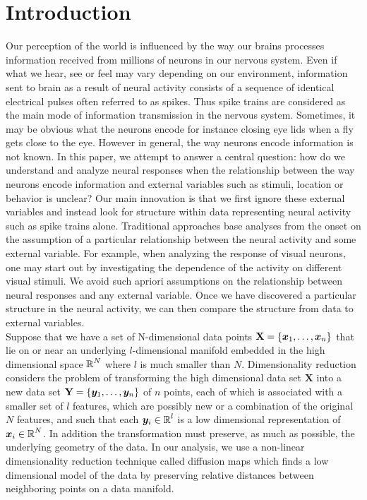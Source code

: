 
\section{Introduction}
 Our perception of the world is influenced by the way our brains processes information received from millions of neurons
 in our nervous system. Even if what we hear, see or feel may vary depending on our environment, information sent to brain
 as a result of neural activity consists of a sequence of identical electrical pulses often referred to as spikes.
 Thus spike trains are considered as the main mode of information transmission in the nervous system.  Sometimes, it may be obvious what the neurons encode for instance closing eye lids when a fly gets close to the eye. However in general,  the way neurons encode information is not known. In this paper, we attempt to answer a central question: how do we understand
 and analyze neural responses when the relationship between the way neurons encode information and external variables
 such as stimuli, location or behavior  is unclear? Our main innovation is  that we  first ignore these external variables and instead look for structure within data representing neural activity such as spike trains alone. Traditional approaches base analyses from the onset on the assumption of a particular relationship between the neural activity and some external variable.
For example, when analyzing the response of visual neurons, one may start out by investigating the dependence of the activity on different visual stimuli. We avoid such apriori assumptions on the relationship between neural responses and any external variable.  Once we have discovered a particular structure in the neural activity, we can then compare the structure
from data to external variables. \\

Suppose that we have a set of  N-dimensional data points $\textbf{X} = \{\boldsymbol{x}_1, \ldots , \boldsymbol{x}_n \}$ that lie on or near an underlying $l$-dimensional manifold embedded in the high dimensional space $\operatorname{\mathbb{R}}^N$ where $l$ is much smaller than $N$. Dimensionality reduction considers the problem of  transforming the high dimensional data set $\textbf{X}$ into a new data set $\textbf{Y} = \displaystyle \{ \boldsymbol{y}_{1}, \ldots, \boldsymbol{y}_{n} \}$  of $n$ points, each of which is associated
with a smaller set of $l$ features, which are possibly new or a combination of the original $N$ features, and such that each $\boldsymbol{y}_{i} \in \operatorname{\mathbb{R}}^{l}$ is a low dimensional representation of $\boldsymbol{x}_{i} \in \operatorname{\mathbb{R}}^{N}$. In addition the transformation must preserve, as much as possible, the underlying geometry of the data. In our analysis, we use a non-linear dimensionality reduction technique called diffusion maps which finds a low dimensional model of the  data by preserving relative distances between neighboring points on a data manifold. \\

